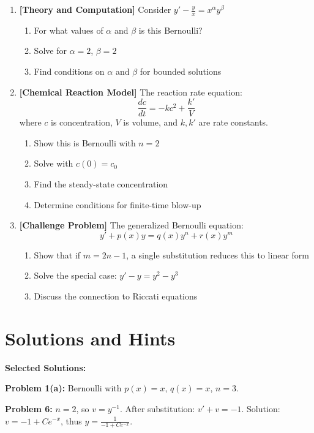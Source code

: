 \documentclass[12pt]{article}
\begin{document}
\begin{enumerate}[resume]
    \item \textbf{[Theory and Computation]}
    Consider $y' - \frac{y}{x} = x^{\alpha}y^{\beta}$
    \begin{enumerate}
        \item For what values of $\alpha$ and $\beta$ is this Bernoulli?
        \item Solve for $\alpha = 2$, $\beta = 2$
        \item Find conditions on $\alpha$ and $\beta$ for bounded solutions
    \end{enumerate}

    \item \textbf{[Chemical Reaction Model]}
    The reaction rate equation:
    $$\frac{dc}{dt} = -kc^2 + \frac{k'}{V}$$
    where $c$ is concentration, $V$ is volume, and $k, k'$ are rate constants.
    \begin{enumerate}
        \item Show this is Bernoulli with $n = 2$
        \item Solve with $c(0) = c_0$
        \item Find the steady-state concentration
        \item Determine conditions for finite-time blow-up
    \end{enumerate}

    \item \textbf{[Challenge Problem]}
    The generalized Bernoulli equation:
    $$y' + p(x)y = q(x)y^n + r(x)y^m$$
    \begin{enumerate}
        \item Show that if $m = 2n - 1$, a single substitution reduces this to linear form
        \item Solve the special case: $y' - y = y^2 - y^3$
        \item Discuss the connection to Riccati equations
    \end{enumerate}
\end{enumerate}

\section*{Solutions and Hints}

\textbf{Selected Solutions:}

\textbf{Problem 1(a):} Bernoulli with $p(x) = x$, $q(x) = x$, $n = 3$.

\textbf{Problem 6:} $n = 2$, so $v = y^{-1}$. After substitution: $v' + v = -1$.
Solution: $v = -1 + Ce^{-x}$, thus $y = \frac{1}{-1 + Ce^{-x}}$.
\end{document}
